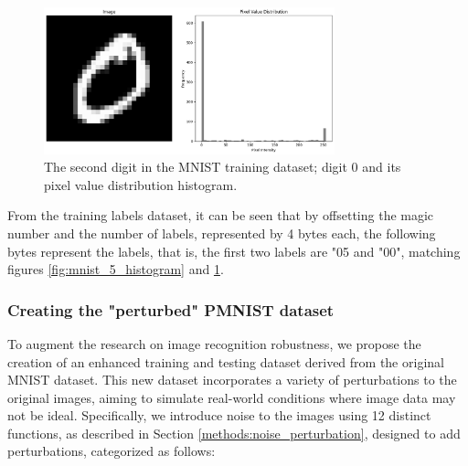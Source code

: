 \begin{figure}[h]
    \centering
    \includegraphics[width=0.75\textwidth]{Figures/Methods/MNIST_0_with_histogram.png}
    \caption{The second digit in the MNIST training dataset; digit 0 and its pixel value distribution histogram.}
    \label{fig:mnist_0_histogram}
\end{figure}

From the training labels dataset, it can be seen that by offsetting the magic number and the number of labels, represented by 4 bytes each, the following bytes represent the labels, that is, the first two labels are "05 and "00", matching figures \ref{fig:mnist_5_histogram} and \ref{fig:mnist_0_histogram}.


\subsubsection{Creating the "perturbed" PMNIST dataset}

To augment the research on image recognition robustness, we propose the creation of an enhanced training and testing dataset derived from the original MNIST dataset. This new dataset incorporates a variety of perturbations to the original images, aiming to simulate real-world conditions where image data may not be ideal. Specifically, we introduce noise to the images using 12 distinct functions, as described in Section \ref{methods:noise_perturbation}, designed to add perturbations, categorized as follows:

